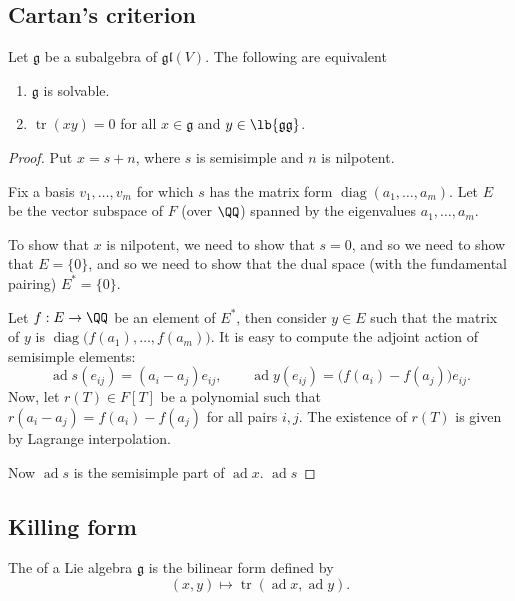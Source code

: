 \documentclass{article}
\DeclarePairedDelimiter\lb\lbrack\rbrack
\DeclareMathOperator{\tr}{tr}
\DeclareMathOperator{\diag}{diag}
\DeclareMathOperator{\ad}{ad}
\newcommand*\frkg{{\ensuremath{\mathfrak{g}}}}
\newcommand*\glalg{\ensuremath{\mathfrak{gl}}}
\begin{document}
\subsection{Cartan's criterion}

\begin{theorem}
    Let $\frkg$ be a subalgebra of $\glalg(V)$.
    The following are equivalent
    \begin{enumerate}[label=(\alph*)]
        \item
            $\frkg$ is solvable.
        \item 
            $\tr(xy) = 0$ for all $x \in \frkg$ and $y \in \lb{\frkg\frkg}$.
    \end{enumerate}
\end{theorem}

\begin{proof}
    Put $x = s + n$, where $s$ is semisimple and $n$ is nilpotent.

    Fix a basis $v_1,\ldots,v_m$ for which $s$ has the matrix form $\diag(a_1,\ldots,a_m)$.
    Let $E$ be the vector subspace of $F$ (over $\QQ$) spanned by the eigenvalues $a_1,\ldots,a_m$.

    To show that $x$ is nilpotent, we need to show that $s = 0$, and so we need to show that $E = \{0\}$, and so we need to show that the dual space (with the fundamental pairing) $E^\ast = \{0\}$.

    Let $f: E \to \QQ$ be an element of $E^\ast$, then consider $y \in E$ such that the matrix of $y$ is $\diag\big(f(a_1),\ldots,f(a_m)\big)$.
    It is easy to compute the adjoint action of semisimple elements:
    \[
        \ad s (e_{ij})
        =
        (a_i - a_j)e_{ij}, \qquad
        \ad y (e_{ij})
        =
        \big(f(a_i) - f(a_j)\big)e_{ij}.
    \]
    Now, let $r(T) \in F[T]$ be a polynomial such that $r(a_i-a_j) = f(a_i)-f(a_j)$ for all pairs $i, j$.
    The existence of $r(T)$ is given by Lagrange interpolation.

    Now $\ad s$ is the semisimple part of $\ad x$.
    $\ad s$

\end{proof}

\subsection{Killing form}

\begin{definition}
    The  of a Lie algebra $\frkg$ is the bilinear form defined by
    \[
        (x, y)
        \mapsto
        \tr(\ad x, \ad y).
    \]
\end{definition}
\end{document}

